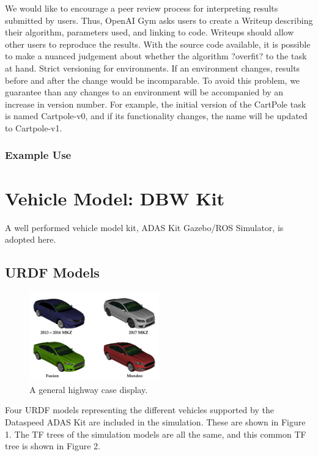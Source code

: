 We would like to encourage a peer review process for interpreting results submitted by users. Thus, OpenAI Gym asks users to create a Writeup describing their algorithm, parameters used, and linking to code. Writeups should allow other users to reproduce the results. With the source code available, it is possible to make a nuanced judgement about whether the algorithm ?overfit? to the task at hand.
Strict versioning for environments. If an environment changes, results before and after the change would be incomparable. To avoid this problem, we guarantee than any changes to an environment will be accompanied by an increase in version number. For example, the initial version of the CartPole task is named Cartpole-v0, and if its functionality changes, the name will be updated to Cartpole-v1.

\subsubsection{Example Use}

\section{Vehicle Model: DBW Kit}

A well performed vehicle model kit, ADAS Kit Gazebo/ROS Simulator, is adopted here.

\subsection{URDF Models}

\begin{figure}[h]
\centering
\includegraphics[width=0.5\textwidth]{figs/ch2/mkz-cover}
\caption{A general highway case display.}
\end{figure}

Four URDF models representing the different vehicles supported by the Dataspeed ADAS Kit are included in the simulation. These are shown in Figure 1. The TF trees of the simulation models are all the same, and this common TF tree is shown in Figure 2.

